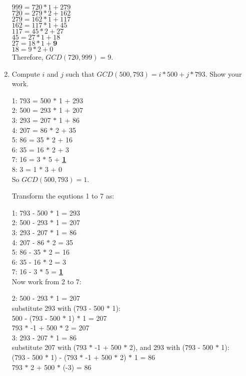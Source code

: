 \documentclass[11pt]{article}
\begin{document}
\begin{enumerate}
$999 = 720 * 1 + 279$\\
$720 = 279 * 2 + 162$\\
$279 = 162 * 1 + 117$\\
$162 = 117 * 1 + 45$\\
$117 = 45 * 2 + 27$\\
$45 = 27 * 1 + 18$\\
$27 = 18 * 1 + \textbf{9}$\\
$18 = 9 * 2 + 0$\\

Therefore, $GCD(720,999) = 9$.

\item Compute $i$ and $j$ such that $GCD(500, 793) = i * 500 + j *
  793$. Show your work.

1: 793 = 500 $*$ 1 + 293\\
2: 500 = 293 $*$ 1 + 207\\
3: 293 = 207 $*$ 1 + 86\\
4: 207 = 86  $*$ 2  + 35\\
5: 86  = 35  $*$ 2  + 16\\
6: 35  = 16  $*$ 2  + 3\\
7: 16  = 3   $*$ 5 + \underline{\textbf{1}}\\
8: 3   = 1   $*$ 3 + 0\\

So $GCD(500, 793) = 1$.

Transform the equtions 1 to 7 as:

1: 793 - 500 $*$ 1 = 293\\
2: 500 - 293 $*$ 1 = 207\\
3: 293 - 207 $*$ 1 = 86\\
4: 207 - 86  $*$ 2  = 35\\
5: 86  - 35  $*$ 2  = 16\\
6: 35  - 16  $*$ 2  = 3\\
7: 16  - 3   $*$ 5 = \underline{\textbf{1}}\\

Now work from 2 to 7:

2: 500 - 293 $*$ 1 = 207\\
substitute 293 with (793 - 500 $*$ 1):\\ 
500 - (793 - 500 $*$ 1) $*$ 1 = 207\\
793 $*$ -1 + 500 $*$ 2 = 207\\

3: 293 - 207 $*$ 1 = 86\\
substitute 207 with (793 $*$ -1 + 500 $*$ 2), and 293 with (793 - 500 $*$ 1):\\
(793 - 500 $*$ 1) - (793 $*$ -1 + 500 $*$ 2) $*$ 1 = 86\\
793 $*$ 2 + 500 $*$ (-3) = 86\\


\end{enumerate}
\end{document}

